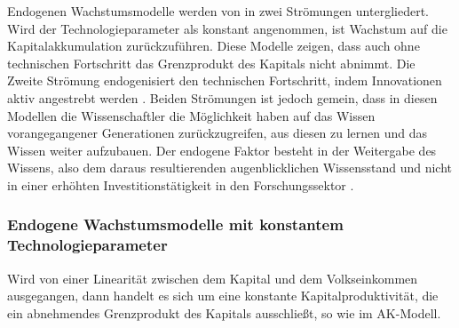 %
Endogenen Wachstumsmodelle werden von \cite{Frenkel.1999} in zwei Strömungen untergliedert. Wird der Technologieparameter als konstant angenommen, ist Wachstum auf die Kapitalakkumulation zurückzuführen. Diese Modelle zeigen, dass auch ohne technischen Fortschritt das Grenzprodukt des Kapitals nicht abnimmt. Die Zweite Strömung endogenisiert den technischen Fortschritt, indem Innovationen aktiv angestrebt werden \cite{Frenkel.1999}. Beiden Strömungen ist jedoch gemein, dass in diesen Modellen  die Wissenschaftler die Möglichkeit haben auf das Wissen vorangegangener Generationen zurückzugreifen, aus diesen zu lernen und das Wissen weiter aufzubauen. Der endogene Faktor besteht in der Weitergabe des Wissens, also dem daraus resultierenden augenblicklichen Wissensstand und nicht in einer erhöhten Investitionstätigkeit in den Forschungssektor \cite{Romer.1990,Rebelo.1991}.
%
\subsubsection{Endogene Wachstumsmodelle mit konstantem Technologieparameter}
%
Wird von einer Linearität zwischen dem Kapital und dem Volkseinkommen ausgegangen, dann handelt es sich um eine konstante Kapitalproduktivität, die ein abnehmendes Grenzprodukt des Kapitals ausschließt, so wie im AK-Modell. 
%
